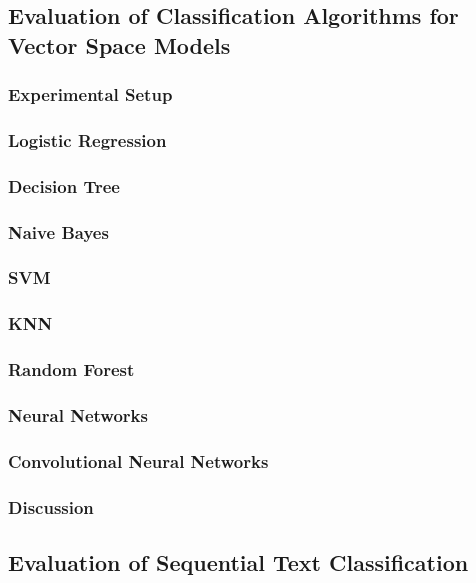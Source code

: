 \subsection{Evaluation of Classification Algorithms for Vector Space Models}

\subsubsection{Experimental Setup}

\subsubsection{Logistic Regression}

\subsubsection{Decision Tree}

\subsubsection{Naive Bayes}

\subsubsection{SVM}
\subsubsection{KNN}
\subsubsection{Random Forest}
\subsubsection{Neural Networks}
\subsubsection{Convolutional Neural Networks}


\subsubsection{Discussion}


\subsection{Evaluation of Sequential Text Classification}


